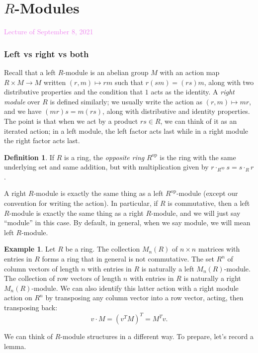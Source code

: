 \documentclass{amsart}[12pt]
\newcommand{\Sept}[1]{\textcolor{violet}{Lecture of September #1, 2021}}
\newcommand{\DEF}[1]{\emph{#1}\index{#1}}
\newcommand{\Def}[1]{#1 \index{#1}}
\numberwithin{equation}{section}
\theoremstyle{plain} %
\theoremstyle{definition}
\newtheorem{defn}[equation]{Definition}
\newtheorem{ex}[equation]{Example}
\theoremstyle{remark}
\renewcommand{\sec}[1]{\section{#1}}
\newcommand{\sssec}[1]{\subsubsection{#1}}
\begin{document}
\sec{$R$-Modules}


\Sept{8}


\sssec{Left vs right vs both}

Recall that a left $R$-module is an abelian group $M$ with an action map $R\times M \to M$ written $(r,m)\mapsto rm$ such that $r(sm) = (rs)m$, along with two distributive properties and the condition that $1$ acts as the identity.
A \DEF{right module} over $R$ is defined similarly; we usually write the action as $(r,m)\mapsto mr$, and we have $(mr)s = m(rs)$, along with distributive and identity properties. The point is that when we act by a product $rs\in R$, we can think of it as an iterated action; in a left module, the left factor acts last while in a right module the right factor acts last.

\begin{defn} If $R$ is a ring, the \DEF{opposite ring} \Def{$R^{\mathrm{op}}$} is the ring with the same underlying set and same addition, but with multiplication given by $r \cdot_{R^{\mathrm{op}}} s = s \cdot_{R} r$.
\end{defn}

A right $R$-module is exactly the same thing as a left $R^{\mathrm{op}}$-module (except our convention for writing the action). In particular, if $R$ is commutative, then a left $R$-module is exactly the same thing as a right $R$-module, and we will just say ``module'' in this case. By default, in general, when we say module, we will mean left $R$-module.

\begin{ex}
Let $R$ be a ring. The collection \Def{$M_n(R)$} of $n\times n$ matrices with entries in $R$ forms a ring that in general is not commutative. The set \Def{$R^n$} of column vectors of length $n$ with entries in $R$ is naturally a left $M_n(R)$-module. The collection of row vectors of length $n$ with entries in $R$ is naturally a right $M_n(R)$-module. We can also identify this latter action with a right module action on $R^n$ by transposing any column vector into a row vector, acting, then transposing back:
\[ v \cdot M = (v^T M)^T=M^T v.\]
\end{ex}

We can think of $R$-module structures in a different way. To prepare, let's record a lemma.
\end{document}
